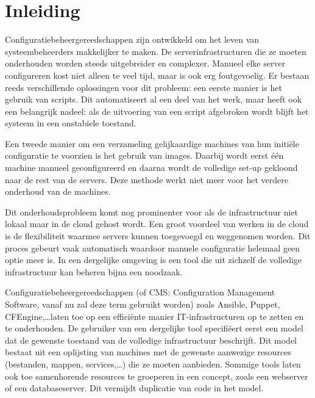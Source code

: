 \chapter{Inleiding}
\label{inleiding}
Configuratiebeheergereedschappen zijn ontwikkeld om het leven van systeembeheerders makkelijker te maken.
De serverinfrastructuren die ze moeten onderhouden worden steeds uitgebreider en complexer.
Manueel elke server configureren kost niet alleen te veel tijd, maar is ook erg foutgevoelig.\cite{why_do_upgrades_fail}
Er bestaan reeds verschillende oplossingen voor dit probleem:
een eerste manier is het gebruik van scripts.
Dit automatiseert al een deel van het werk, maar heeft ook een belangrijk nadeel:
als de uitvoering van een script afgebroken wordt blijft het systeem in een onstabiele toestand.\cite{sysadvent}

Een tweede manier om een verzameling gelijkaardige machines van hun initi\"ele configuratie te voorzien is het gebruik van images.
Daarbij wordt eerst \'e\'en machine manueel geconfigureerd en daarna wordt de volledige set-up gekloond naar de rest van de servers.
Deze methode werkt niet meer voor het verdere onderhoud van de machines.

Dit onderhoudsprobleem komt nog prominenter voor als de infrastructuur niet lokaal maar in de cloud gehost wordt.
Een groot voordeel van werken in de cloud is de flexibiliteit waarmee servers kunnen toegevoegd en weggenomen worden.
Dit proces gebeurt vaak automatisch waardoor manuele configuratie helemaal geen optie meer is.
In een dergelijke omgeving is een tool die uit zichzelf de volledige infrastructuur kan beheren bijna een noodzaak. \cite{opening_the_clouds,deploying_elastic_services}

Configuratiebeheergereedschappen (of CMS: Configuration Management Software, vanaf nu zal deze term gebruikt worden) zoals Ansible\cite{ansible}, Puppet\cite{puppet}, CFEngine\cite{cfengine},\ldots laten toe op een effici\"ente manier IT-infrastructuren op te zetten en te onderhouden.
De gebruiker van een dergelijke tool specifi\"eert eerst een model dat de gewenste toestand van de volledige infrastructuur beschrijft.
Dit model bestaat uit een oplijsting van machines met de gewenste aanwezige resources (bestanden, mappen, services,\ldots) die ze moeten aanbieden.
Sommige tools laten ook toe samenhorende resources te groeperen in een concept, zoals een webserver of een databaseserver.
Dit vermijdt duplicatie van code in het model.

